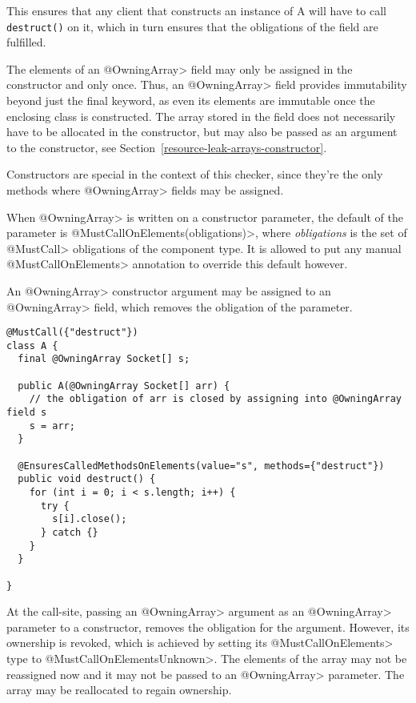 This ensures that any client that constructs an instance of A will have to call \texttt{destruct()} on it, which in turn ensures that the obligations of the field are fulfilled.

The elements of an \<@OwningArray> field may only be assigned in the constructor and only once. Thus, an \<@OwningArray> field provides immutability beyond just the final keyword, as even its elements are immutable once the enclosing class is constructed. The array stored in the field does not necessarily have to be allocated in the constructor, but may also be passed as an argument to the constructor, see Section~\ref{resource-leak-arrays-constructor}.

Constructors are special in the context of this checker, since they're the only methods where \<@OwningArray> fields may be assigned.

When \<@OwningArray> is written on a constructor parameter, the default of the parameter is \<@MustCallOnElements(obligations)>, where \textit{obligations} is the set of \<@MustCall> obligations of the component type. It is allowed to put any manual \<@MustCallOnElements> annotation to override this default however.

An \<@OwningArray> constructor argument may be assigned to an \<@OwningArray> field, which removes the obligation of the parameter.

\begin{verbatim}
@MustCall({"destruct"})
class A {
  final @OwningArray Socket[] s;

  public A(@OwningArray Socket[] arr) {
    // the obligation of arr is closed by assigning into @OwningArray field s
    s = arr;
  }

  @EnsuresCalledMethodsOnElements(value="s", methods={"destruct"})
  public void destruct() {
    for (int i = 0; i < s.length; i++) {
      try {
        s[i].close();
      } catch {}
    }
  }

}
\end{verbatim}

At the call-site, passing an \<@OwningArray> argument as an \<@OwningArray> parameter to a constructor, removes the obligation for the argument. However, its ownership is revoked, which is achieved by setting its \<@MustCallOnElements> type to \<@MustCallOnElementsUnknown>. The elements of the array may not be reassigned now and it may not be passed to an \<@OwningArray> parameter. The array may be reallocated to regain ownership.

